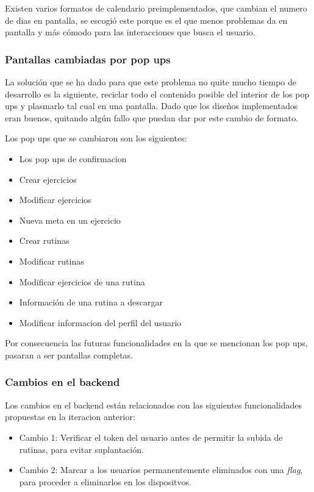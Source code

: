 Existen varios formatos de calendario preimplementados, que cambian el numero de dias en pantalla, se escogió este porque es el que menos problemas da en pantalla y más cómodo para las interacciones que busca el usuario.

\subsubsection{Pantallas cambiadas por pop ups}

La solución que se ha dado para que este problema no quite mucho tiempo de desarrollo es la siguiente, reciclar todo el contenido posible del interior de los pop ups y plasmarlo tal cual en una pantalla. Dado que los diseños implementados eran buenos, quitando algún fallo que puedan dar por este cambio de formato.

Los pop ups que se cambiaron son los siguientes:

\begin{itemize}
	\item Los pop ups de confirmacion
	\item Crear ejercicios
	\item Modificar ejercicios
	\item Nueva meta en un ejercicio
	\item Crear rutinas
	\item Modificar rutinas
	\item Modificar ejercicios de una rutina
	\item Información de una rutina a descargar
	\item Modificar informacion del perfil del usuario
\end{itemize}

Por consecuencia las futuras funcionalidades en la que se mencionan los pop ups, pasaran a ser pantallas completas.

\subsubsection{Cambios en el backend}

Los cambios en el backend están relacionados con las siguientes funcionalidades propuestas en la iteracion anterior:

\begin{itemize}
	\item Cambio 1: Verificar el token del usuario antes de permitir la subida de rutinas, para evitar suplantación.
  	\item Cambio 2: Marcar a los usuarios permanentemente eliminados con una \textit{flag}, para proceder a eliminarlos en los dispositvos.
\end{itemize}

